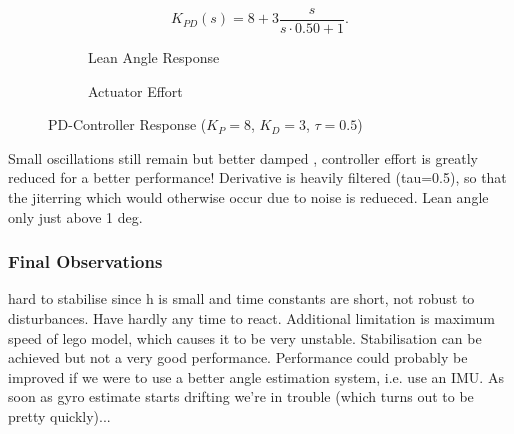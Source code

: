 \begin{equation}
K_{PD}(s) = 8 + 3 \frac{s}{s \cdot 0.50 + 1}.
\end{equation}
\begin{figure}[H]
	\begin{subfigure}{0.5\textwidth}
	\caption{Lean Angle Response}
	\end{subfigure} \hspace{1mm}
	\begin{subfigure}{0.5\textwidth}
	\caption{Actuator Effort}
	\end{subfigure}
	\caption{PD-Controller Response ($K_P=8$, $K_D=3$, $\tau=0.5$)}
	\label{fig:LegoP12Controller}
\end{figure}

Small oscillations still remain but better damped , controller effort is greatly reduced for a better performance! Derivative is heavily filtered (tau=0.5), so that the jiterring which would otherwise occur due to noise is redueced. Lean angle only just above 1 deg.

\subsubsection{Final Observations}
hard to stabilise since h is small and time constants are short, not robust to disturbances. Have hardly any time to react. Additional limitation is maximum speed of lego model, which causes it to be very unstable. Stabilisation can be achieved but not a very good performance. Performance could probably be improved if we were to use a better angle estimation system, i.e. use an IMU. As soon as gyro estimate starts drifting we're in trouble (which turns out to be pretty quickly)...